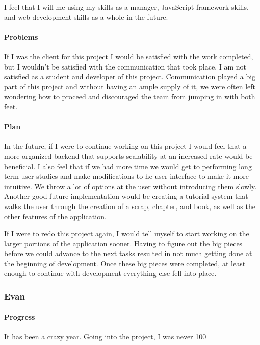 \documentclass[onecolumn, draftclsnofoot,10pt, compsoc]{IEEEtran}
\begin{document}
	I feel that I will me using my skills as a manager, JavaScript framework skills, and web development skills as a whole in the future.
	
	
	\paragraph{Problems}
	If I was the client for this project I would be satisfied with the work completed, but I wouldn't be satisfied with the communication that took place. I am not satisfied as a student and developer of this project. Communication played a big part of this project and without having an ample supply of it, we were often left wondering how to proceed and discouraged the team from jumping in with both feet. 
	
	\paragraph{Plan}
	
	In the future, if I were to continue working on this project I would feel that a more organized backend that supports scalability at an increased rate would be beneficial. I also feel that if we had more time we would get to performing long term user studies and make modifications to he user interface to make it more intuitive. We throw a lot of options at the user without introducing them slowly. Another good future implementation would be creating a tutorial system that walks the user through the creation of a scrap, chapter, and book, as well as the other features of the application.
	
	If I were to redo this project again, I would tell myself to start working on the larger portions of the application sooner. Having to figure out the big pieces before we could advance to the next tasks resulted in not much getting done at the beginning of development. Once these big pieces were completed, at least enough to continue with development everything else fell into place. 
	
	\subsubsection{Evan}
	
	\paragraph{Progress}
	
	It has been a crazy year. Going into the project, I was never 100%
	
\end{document}

